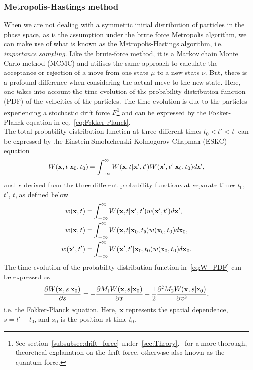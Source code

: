 \documentclass[
    a4paper, aps, twocolumn, floatfix, superscriptaddress,
    nofootinbib]{revtex4-1}
\begin{document}
\subsubsection{Metropolis-Hastings method}\label{subsubsec:Metropolis-Hastings} When we are not dealing with a symmetric initial distribution of particles in the phase space, as is the assumption under the brute force Metropolis algorithm, we can make use of what is known as the Metropolis-Hastings algorithm, i.e. \textit{importance sampling}. Like the brute-force method, it is a Markov chain Monte Carlo method (MCMC) and utilises the same approach to calculate the acceptance or rejection of a move from one state $\mu$ to a new state $\nu$. But, there is a profound difference when considering the actual move to the new state. Here, one takes into account the time-evolution of the probability distribution function (PDF) of the velocities of the particles. The time-evolution is due to the particles experiencing a stochastic drift force $F$\footnote{See section~\ref{subsubsec:drift_force} under~\ref{sec:Theory}.~ for a more thorough, theoretical explanation on the drift force, otherwise also known as the quantum force.} and can be expressed by the Fokker-Planck equation in eq.~\ref{eq:Fokker-Planck}. \\

\indent The total probability distribution function at three different times $t_0 < t' < t$, can be expressed by the Einstein-Smoluchenski-Kolmogorov-Chapman (ESKC) equation
\begin{align}
    W(\bold x, t | \bold x_0, t_0) = \int_{-\infty}^\infty W(\bold x, t | \bold x', t')W(\bold x', t' | \bold x_0, t_0)d\bold x', \label{eq:W_PDF}
\end{align}
and is derived from the three different probability functions at separate times $t_0$, $t'$, $t$, as defined below
\begin{align*}
    w(\bold x, t) &= \int_{-\infty}^\infty W(\bold x, t | \bold x', t') w(\bold x', t')d\bold x', \\
    w(\bold x, t) &= \int_{-\infty}^\infty W(\bold x, t | \bold x_0, t_0) w(\bold x_0, t_0)d\bold x_0, \\
    w(\bold x', t') &= \int_{-\infty}^\infty W(\bold x', t' | \bold x_0, t_0) w(\bold x_0, t_0)d\bold x_0.
\end{align*}
The time-evolution of the probability distribution function in~\eqref{eq:W_PDF} can be expressed as
\begin{align}
    \frac{\partial W(\bold x, s | \bold x_0)}{\partial s} = -\frac{\partial M_1 W(\bold x, s | \bold x_0)}{\partial x} + \frac{1}{2}\frac{\partial^2 M_2 W(\bold x, s | \bold x_0)}{\partial x^2} \label{eq:Fokker-Planck},
\end{align}
i.e. the Fokker-Planck equation. Here, $\bold x$ represents the spatial dependence, $s = t' - t_0$, and $x_0$ is the  position at time $t_0$.
\end{document}
